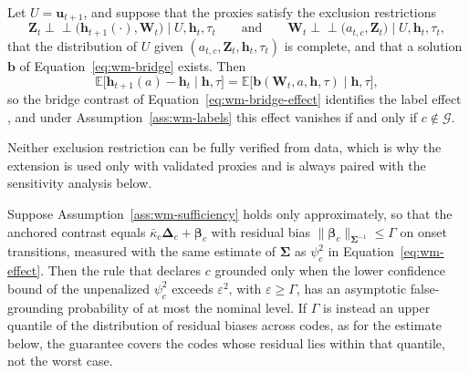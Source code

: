 \begin{proposition}
\label{prop:wm-proximal}
Let $U=\mathbf{u}_{t+1}$, and suppose that the proxies satisfy the exclusion restrictions
\[
\mathbf{Z}_t\perp\!\!\!\perp\big(\mathbf{h}_{t+1}(\cdot),\mathbf{W}_t\big)\mid U,\mathbf{h}_t,\tau_t
\qquad\text{and}\qquad
\mathbf{W}_t\perp\!\!\!\perp\big(a_{t,c},\mathbf{Z}_t\big)\mid U,\mathbf{h}_t,\tau_t,
\]
that the distribution of $U$ given $(a_{t,c},\mathbf{Z}_t,\mathbf{h}_t,\tau_t)$ is complete, and that a solution $\mathbf{b}$ of Equation~\eqref{eq:wm-bridge} exists. Then
\[
\mathbb{E}\big[\mathbf{h}_{t+1}(a)-\mathbf{h}_t\mid\mathbf{h},\tau\big]=\mathbb{E}\big[\mathbf{b}(\mathbf{W}_t,a,\mathbf{h},\tau)\mid\mathbf{h},\tau\big],
\]
so the bridge contrast of Equation~\eqref{eq:wm-bridge-effect} identifies the label effect \citep{miao2018proxy,tchetgen2020proximal}, and under Assumption~\ref{ass:wm-labels} this effect vanishes if and only if $c\notin\mathcal{G}$.
\end{proposition}

Neither exclusion restriction can be fully verified from data, which is why the extension is used only with validated proxies and is always paired with the sensitivity analysis below.

\begin{proposition}
\label{prop:wm-sensitivity}
Suppose Assumption~\ref{ass:wm-sufficiency} holds only approximately, so that the anchored contrast equals $\bar{\kappa}_c\boldsymbol{\Delta}_c+\boldsymbol{\beta}_c$ with residual bias $\|\boldsymbol{\beta}_c\|_{\boldsymbol{\Sigma}^{-1}}\leq\Gamma$ on onset transitions, measured with the same estimate of $\boldsymbol{\Sigma}$ as $\psi^{2}_c$ in Equation~\eqref{eq:wm-effect}. Then the rule that declares $c$ grounded only when the lower confidence bound of the unpenalized $\psi^{2}_c$ exceeds $\varepsilon^{2}$, with $\varepsilon\geq\Gamma$, has an asymptotic false-grounding probability of at most the nominal level. If $\Gamma$ is instead an upper quantile of the distribution of residual biases across codes, as for the estimate below, the guarantee covers the codes whose residual lies within that quantile, not the worst case.
\end{proposition}

